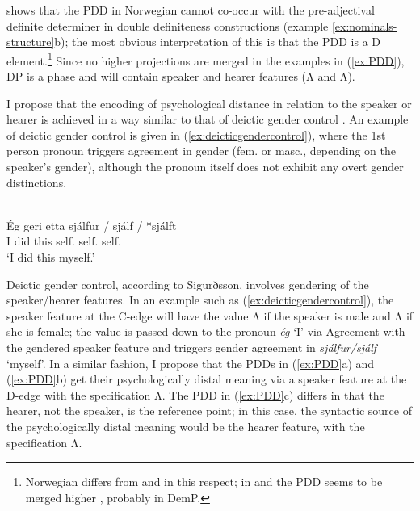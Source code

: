 \documentclass[output=paper]{langsci/langscibook}
\begin{document}
\noindent \citet[178]{johannessen2008psycological} shows that the \gls{PDD} in
Norwegian cannot co-occur with the pre-adjectival definite determiner in double
definiteness constructions (example \ref{ex:nominals-structure}b); the most
obvious interpretation of this  is that the
\gls{PDD} is a D
element.\footnote{Norwegian differs from  and  in this
respect; in  and  the \gls{PDD} seems to be merged
higher \citep[175--176]{johannessen2008psycological}, probably in DemP.} Since
no higher projections are merged in the examples in (\ref{ex:PDD}), DP is a
phase and will contain speaker and hearer features (Λ and
Λ).

I propose that the encoding of psychological distance in relation to the
speaker or hearer is achieved in a way similar to that of deictic gender
control  \citep[185--186]{sigurdsson2014context}. An example of deictic gender
control is given in (\ref{ex:deicticgendercontrol}), where the  1st
person pronoun triggers agreement in gender (fem. or masc., depending on the
speaker's gender), although the pronoun itself does not exhibit any
overt gender distinctions.\largerpage

\ea\label{ex:deicticgendercontrol} 
\citep[185]{sigurdsson2014context}\\
	\gll Ég ger\dh{}i \th{}etta sjálfur / sjálf / *sjálft\\
    I did this self.\M{} {} self.\glossF{} {} \hphantom{*}self.\glossN{}\\
	\glt `I did this myself.'
	\z

\noindent Deictic gender control, according to Sigurðsson, involves gendering
of the speak\-er/hear\-er features. In an example such as
(\ref{ex:deicticgendercontrol}), the speaker feature at the C-edge will have
the value  Λ if the speaker is male and Λ if she is female;
the value is passed down to the pronoun \emph{ég} \enquote*{I} via Agreement
with the gendered speaker feature and triggers gender agreement in
\emph{sjálfur/sjálf} \enquote*{myself}.  In a similar fashion, I propose that
the PDDs in (\ref{ex:PDD}a) and (\ref{ex:PDD}b) get their
psychologically distal meaning via a speaker feature at the D-edge with the
specification Λ. The \gls{PDD} in (\ref{ex:PDD}c) differs in
that the hearer, not the speaker, is the reference point; in this case, the
syntactic source of the psychologically distal meaning would be the hearer
feature, with the specification Λ.
\end{document}

